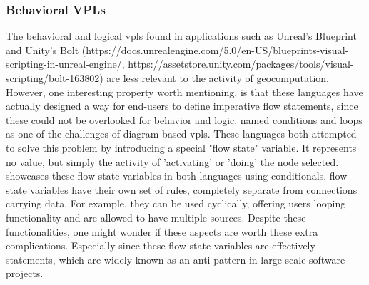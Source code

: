 \subsubsection*{Behavioral VPLs}
The behavioral and logical vpls found in applications such as Unreal's Blueprint and Unity's Bolt (https://docs.unrealengine.com/5.0/en-US/blueprints-visual-scripting-in-unreal-engine/, https://assetstore.unity.com/packages/tools/visual-scripting/bolt-163802) are less relevant to the activity of geocomputation.
However, one interesting property worth mentioning, is that these languages have actually designed a way for end-users to define imperative flow statements, since these could not be overlooked for behavior and logic.
 named conditions and loops as one of the challenges of diagram-based vpls. 
These languages both attempted to solve this problem by introducing a special "flow state" variable. 
It represents no value, but simply the activity of 'activating' or 'doing' the node selected. 
 showcases these flow-state variables in both languages using conditionals.
flow-state variables have their own set of rules, completely separate from connections carrying data. 
For example, they can be used cyclically, offering users looping functionality and are allowed to have multiple sources.  
Despite these functionalities, one might wonder if these aspects are worth these extra complications.
Especially since these flow-state variables are effectively  statements, which are widely known as an anti-pattern in large-scale software projects. 

